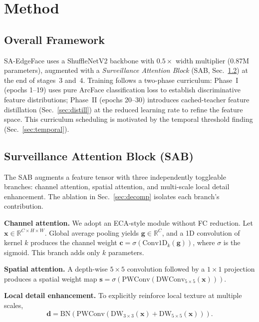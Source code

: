 \section{Method}
\label{sec:method}

\subsection{Overall Framework}
\label{sec:framework}

SA-EdgeFace uses a ShuffleNetV2 backbone with $0.5{\times}$ width multiplier (0.87M parameters), augmented with a \emph{Surveillance Attention Block} (SAB, Sec.~\ref{sec:sab}) at the end of stages~3 and~4. Training follows a two-phase curriculum: Phase~I (epochs 1--19) uses pure ArcFace classification loss to establish discriminative feature distributions; Phase~II (epochs 20--30) introduces cached-teacher feature distillation (Sec.~\ref{sec:distill}) at the reduced learning rate to refine the feature space. This curriculum scheduling is motivated by the temporal threshold finding (Sec.~\ref{sec:temporal}).

\subsection{Surveillance Attention Block (SAB)}
\label{sec:sab}

The SAB augments a feature tensor with three independently toggleable branches: channel attention, spatial attention, and multi-scale local detail enhancement. The ablation in Sec.~\ref{sec:decomp} isolates each branch's contribution.

\textbf{Channel attention.} We adopt an ECA-style module without FC reduction. Let $\mathbf{x}\in\mathbb{R}^{C\times H\times W}$. Global average pooling yields $\mathbf{g}\in\mathbb{R}^{C}$, and a 1D convolution of kernel $k$ produces the channel weight $\mathbf{c} = \sigma(\mathrm{Conv1D}_k(\mathbf{g}))$, where $\sigma$ is the sigmoid. This branch adds only $k$ parameters.

\textbf{Spatial attention.} A depth-wise $5{\times}5$ convolution followed by a $1{\times}1$ projection produces a spatial weight map $\mathbf{s} = \sigma(\mathrm{PWConv}(\mathrm{DWConv}_{5\times5}(\mathbf{x})))$.

\textbf{Local detail enhancement.} To explicitly reinforce local texture at multiple scales,
\begin{equation}
    \mathbf{d} = \mathrm{BN}\!\left(\mathrm{PWConv}\!\left(\mathrm{DW}_{3\times3}(\mathbf{x}) + \mathrm{DW}_{5\times5}(\mathbf{x})\right)\right).
    \label{eq:detail}
\end{equation}

